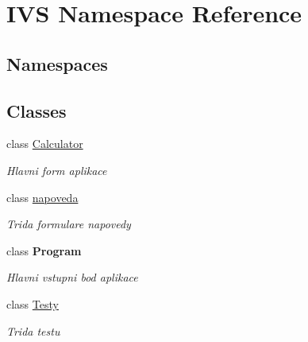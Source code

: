 \hypertarget{namespace_i_v_s}{}\section{I\+VS Namespace Reference}
\label{namespace_i_v_s}
\subsection*{Namespaces}
\begin{DoxyCompactItemize}
\end{DoxyCompactItemize}
\subsection*{Classes}
\begin{DoxyCompactItemize}
\item 
class \mbox{\hyperlink{class_i_v_s_1_1_calculator}{Calculator}}
\begin{DoxyCompactList}\small\item\em Hlavni form aplikace \end{DoxyCompactList}\item 
class \mbox{\hyperlink{class_i_v_s_1_1napoveda}{napoveda}}
\begin{DoxyCompactList}\small\item\em Trida formulare napovedy \end{DoxyCompactList}\item 
class {\bfseries Program}
\begin{DoxyCompactList}\small\item\em Hlavni vstupni bod aplikace \end{DoxyCompactList}\item 
class \mbox{\hyperlink{class_i_v_s_1_1_testy}{Testy}}
\begin{DoxyCompactList}\small\item\em Trida testu \end{DoxyCompactList}\end{DoxyCompactItemize}
